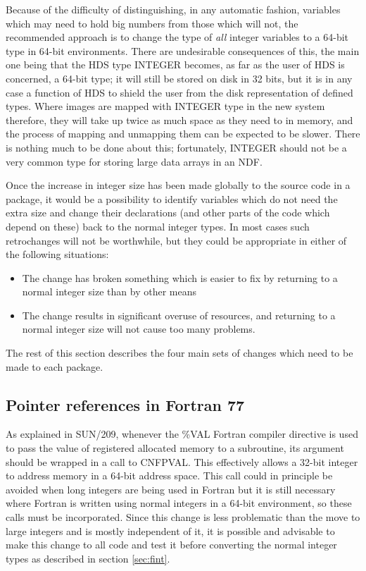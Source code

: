 \documentclass[twoside,11pt]{article}
\newcommand{\xref}[3]{#1}
\renewcommand{\_}{\texttt{\symbol{95}}}
\begin{document}
Because of the difficulty of distinguishing, in any automatic fashion,
variables which may 
need to hold big numbers from those which will not,
the recommended approach is to change the type of {\em all\/} 
integer variables to a 64-bit type in 64-bit environments.
There are undesirable consequences of this,
the main one being that 
the HDS type \_INTEGER becomes, as far as the user of HDS is concerned,
a 64-bit type;
it will still be stored on disk in 32 bits, but it is in any case a
function of HDS to shield the user from the disk representation
of defined types.
Where images are mapped with \_INTEGER type in the new system therefore, 
they will take up twice as much space as they need to in memory,
and the process of mapping and unmapping them can be expected to be slower.
There is nothing much to be done about this;
fortunately, \_INTEGER should not be a very common type for
storing large data arrays in an NDF.

Once the increase in integer size has been made 
globally to the source code in a package,
it would be a possibility 
to identify variables which do not need the extra size
and change their declarations (and other parts of the code which depend
on these) back to the normal integer types.
In most cases such retrochanges will not be worthwhile, 
but they could be appropriate in either of the following situations:
\begin{itemize}
\item
The change has broken something which is easier to fix by returning to 
a normal integer size than by other means
\item
The change results in significant overuse of resources, 
and returning to a normal
integer size will not cause too many problems.
\end{itemize}

The rest of this section describes the four main sets of changes
which need to be made to each package.

\subsection{Pointer references in Fortran 77}

As explained in \xref{SUN/209}{sun209}{pointers},
whenever the \%VAL Fortran compiler directive 
is used to pass the value of registered allocated
memory to a subroutine, its argument should be wrapped in a call
to \xref{CNF\_PVAL}{sun209}{CNF\_PVAL}.  This effectively allows
a 32-bit integer to address memory in a 64-bit address space.
This call could in principle be avoided 
when long integers are being used in Fortran
but it is still 
necessary where Fortran is written using normal integers in a
64-bit environment,
so these calls must be incorporated.
Since this change is less problematic than the move to large integers
and is mostly independent of it,
it is possible and advisable to make this
change to all code and test it before converting the normal integer types
as described in section \ref{sec:fint}.  
\end{document}
